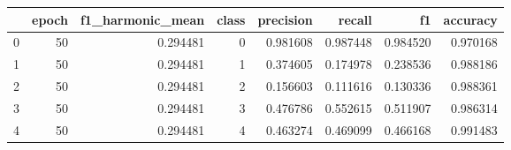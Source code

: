 \begin{tabular}{lrrrrrrr}
\toprule
 & epoch & f1_harmonic_mean & class & precision & recall & f1 & accuracy \\
\midrule
0 & 50 & 0.294481 & 0 & 0.981608 & 0.987448 & 0.984520 & 0.970168 \\
1 & 50 & 0.294481 & 1 & 0.374605 & 0.174978 & 0.238536 & 0.988186 \\
2 & 50 & 0.294481 & 2 & 0.156603 & 0.111616 & 0.130336 & 0.988361 \\
3 & 50 & 0.294481 & 3 & 0.476786 & 0.552615 & 0.511907 & 0.986314 \\
4 & 50 & 0.294481 & 4 & 0.463274 & 0.469099 & 0.466168 & 0.991483 \\
\bottomrule
\end{tabular}
